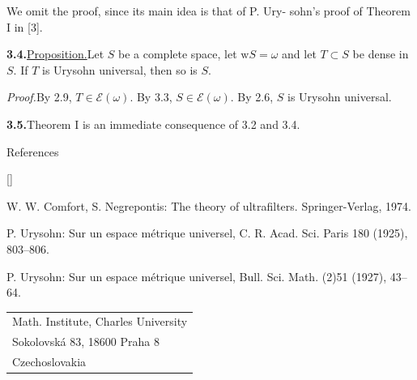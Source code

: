 \documentclass[12pt,a4paper]{article}
\newcommand{\E}{\mathcal{E}}
\newcommand{\wt}{\mathrm{w}}
\newcommand{\itemhead}[2]{\par\noindent\textbf{#1.}\enspace\underline{#2.}\enspace}
\newcommand{\prooftext}{\par\textit{Proof.}\enspace}
\begin{document}
We omit the proof, since its main idea is that of P. Ury-\newpage %
\noindent sohn's proof of Theorem I in [3].

\itemhead{3.4}{Proposition}Let $S$ be a complete space, let $\wt S=\omega$ and let $T\subset S$ be dense in $S$. If $T$ is Urysohn universal, then so is $S$.

\prooftext By 2.9, $T\in\E(\omega)$. By 3.3, $S\in\E(\omega)$. By 2.6, $S$ is Urysohn universal.

\par\noindent\textbf{3.5.}\enspace Theorem I is an immediate consequence of 3.2 and 3.4.

\begin{center}References\end{center}
\begin{list}{[]}{\setlength{\leftmargin}{2.5em}\setlength{\labelwidth}{2em}\setlength{\itemsep}{5pt}}
\item W. W. Comfort, S. Negrepontis: The theory of ultrafilters. Springer-Verlag, 1974.
\item P. Urysohn: Sur un espace m\'etrique universel, C. R. Acad. Sci. Paris 180 (1925), 803--806.
\item P. Urysohn: Sur un espace m\'etrique universel, Bull. Sci. Math. (2)51 (1927), 43--64.
\end{list}
\medskip
\noindent\hspace*{2.5em}\begin{tabular}{@{}l@{}}
Math. Institute, Charles University\\
Sokolovsk\'a 83, 18600 Praha 8\\
Czechoslovakia
\end{tabular}
\end{document}

